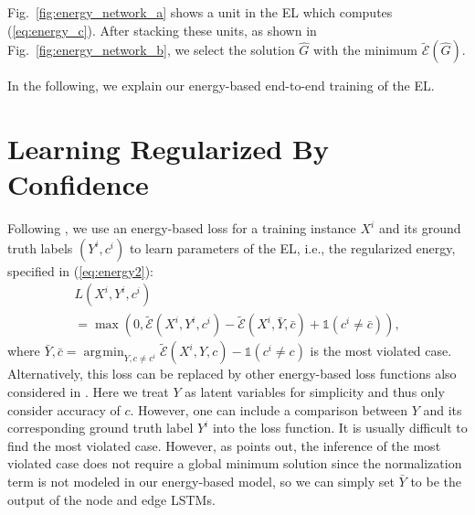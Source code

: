 \documentclass[10pt,twocolumn,letterpaper]{article}
\DeclareMathOperator*{\argmin}{\arg\!\min}
\begin{document}
Fig.~\ref{fig:energy_network_a} shows a unit in the EL which computes (\ref{eq:energy_c}). After stacking these units, as shown in Fig.~\ref{fig:energy_network_b}, we select the solution $\hat{G}$ with the minimum $\tilde{\mathcal{E}}(\hat{G})$.



In the following, we explain our energy-based end-to-end training of the EL.





\section{Learning Regularized By Confidence}\label{sec:learning}

Following \cite{LeCun2006, Belanger2016}, we use an energy-based loss for a training instance $X^i$ and its ground truth labels $(Y^i, c^i)$ to learn parameters of the EL, i.e., the regularized energy, specified in (\ref{eq:energy2}):
\begin{equation}
\begin{array}{l}
L(X^i,Y^i, c^i)\\= \max\left(0, \tilde{\mathcal{E}}(X^i, Y^i, c^i) - \tilde{\mathcal{E}}(X^i, \bar{Y}, \bar{c}) +  \mathds{1}(c^{i} \neq \bar{c})\right),
\end{array}
\label{eq:loss}
\end{equation}
where $\bar{Y}, \bar{c} = \argmin_{Y, c\neq c^i}\tilde{\mathcal{E}}(X^i,Y, c) -  \mathds{1}(c^{i} \neq c)$ is the most violated case. Alternatively, this loss can be replaced by other energy-based loss functions also considered in \cite{LeCun2006}. Here we treat $Y$ as latent variables for simplicity and thus only consider accuracy of $c$. However, one can include a comparison between $Y$ and its corresponding ground truth label $Y^i$ into the loss function. It is usually difficult to find the most violated case. However, as \cite{LeCun2005} points out, the inference of the most violated case does not require a global minimum solution since the normalization term is not modeled in our energy-based model, so we can simply set $\bar{Y}$ to be the output of the node and edge LSTMs.  %
\end{document}
